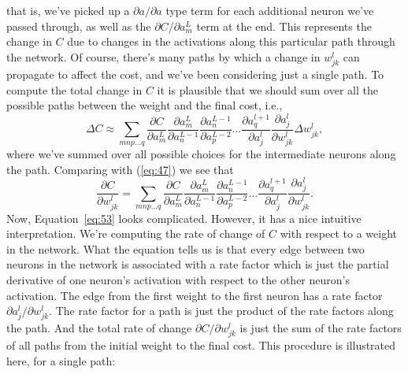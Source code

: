 \documentclass[a4paper,twoside,10pt]{book}
\begin{document}
that is, we've picked up a $\partial{}a/\partial{}a$ type term for each additional neuron we've passed through, as well as the $\partial{}C/\partial{}a^L_m$ term at the end. This represents the change in $C$ due to changes in the activations along this particular path through the network. Of course, there's many paths by which a change in $w^l_{jk}$ can propagate to affect the cost, and we've been considering just a single path. To compute the total change in $C$ it is plausible that we should sum over all the possible paths between the weight and the final cost, i.e.,
\begin{equation}
	\Delta C \approx \sum_{mnp\ldots q} \frac{\partial C}{\partial a^L_m} 
	\frac{\partial a^L_m}{\partial a^{L-1}_n}
	\frac{\partial a^{L-1}_n}{\partial a^{L-2}_p} \ldots
	\frac{\partial a^{l+1}_q}{\partial a^l_j} 
	\frac{\partial a^l_j}{\partial w^l_{jk}} \Delta w^l_{jk},
	\tag{52}\label{eq:52}
\end{equation}
where we've summed over all possible choices for the intermediate neurons along the path. Comparing with (\ref{eq:47}) we see that
\begin{equation}
	\frac{\partial C}{\partial w^l_{jk}} = \sum_{mnp\ldots q} \frac{\partial C}{\partial a^L_m} 
	\frac{\partial a^L_m}{\partial a^{L-1}_n}
	\frac{\partial a^{L-1}_n}{\partial a^{L-2}_p} \ldots
	\frac{\partial a^{l+1}_q}{\partial a^l_j} 
	\frac{\partial a^l_j}{\partial w^l_{jk}}.
	\tag{53}\label{eq:53}
\end{equation}
Now, Equation~\ref{eq:53} looks complicated. However, it has a nice intuitive interpretation. We're computing the rate of change of $C$ with respect to a weight in the network. What the equation tells us is that every edge between two neurons in the network is associated with a rate factor which is just the partial derivative of one neuron's activation with respect to the other neuron's activation. The edge from the first weight to the first neuron has a rate factor $\partial{}a^l_j/\partial{}w^l_{jk}$. The rate factor for a path is just the product of the rate factors along the path. And the total rate of change $\partial{}C/\partial{}w^l_{jk}$ is just the sum of the rate factors of all paths from the initial weight to the final cost. This procedure is illustrated here, for a single path:
\end{document}
